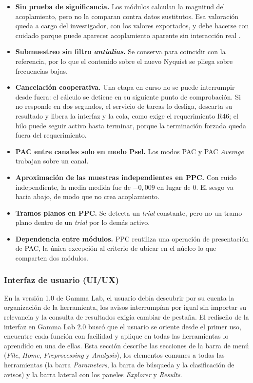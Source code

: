 \documentclass[12pt,letterpaper,oneside]{article}
\begin{document}
\begin{itemize}
  \item \textbf{Sin prueba de significancia.} Los módulos calculan la magnitud del acoplamiento, pero no la comparan contra datos sustitutos. Esa valoración queda a cargo del investigador, con los valores exportados, y debe hacerse con cuidado porque puede aparecer acoplamiento aparente sin interacción real \cite{aru2015}.
  \item \textbf{Submuestreo sin filtro \textit{antialias}.} Se conserva para coincidir con la referencia, por lo que el contenido sobre el nuevo Nyquist se pliega sobre frecuencias bajas.
  \item \textbf{Cancelación cooperativa.} Una etapa en curso no se puede interrumpir desde fuera: el cálculo se detiene en su siguiente punto de comprobación. Si no responde en dos segundos, el servicio de tareas lo desliga, descarta su resultado y libera la interfaz y la cola, como exige el requerimiento R46; el hilo puede seguir activo hasta terminar, porque la terminación forzada queda fuera del requerimiento.
  \item \textbf{PAC entre canales solo en modo Psel.} Los modos PAC y PAC \textit{Average} trabajan sobre un canal.
  \item \textbf{Aproximación de las muestras independientes en PPC.} Con ruido independiente, la media medida fue de $-0{,}009$ en lugar de 0. El sesgo va hacia abajo, de modo que no crea acoplamiento.
  \item \textbf{Tramos planos en PPC.} Se detecta un \textit{trial} constante, pero no un tramo plano dentro de un \textit{trial} por lo demás activo.
  \item \textbf{Dependencia entre módulos.} PPC reutiliza una operación de presentación de PAC, la única excepción al criterio de ubicar en el núcleo lo que comparten dos módulos.
\end{itemize}

\subsubsection{Interfaz de usuario (UI/UX)}

En la versión 1.0 de Gamma Lab, el usuario debía descubrir por su cuenta la organización de la herramienta, los avisos interrumpían por igual sin importar su relevancia y la consulta de resultados exigía cambiar de pestaña. El rediseño de la interfaz en Gamma Lab 2.0 buscó que el usuario se oriente desde el primer uso, encuentre cada función con facilidad y aplique en todas las herramientas lo aprendido en una de ellas. Esta sección describe las secciones de la barra de menú (\textit{File}, \textit{Home}, \textit{Preprocessing} y \textit{Analysis}), los elementos comunes a todas las herramientas (la barra \textit{Parameters}, la barra de búsqueda y la clasificación de avisos) y la barra lateral con los paneles \textit{Explorer} y \textit{Results}.
\end{document}
